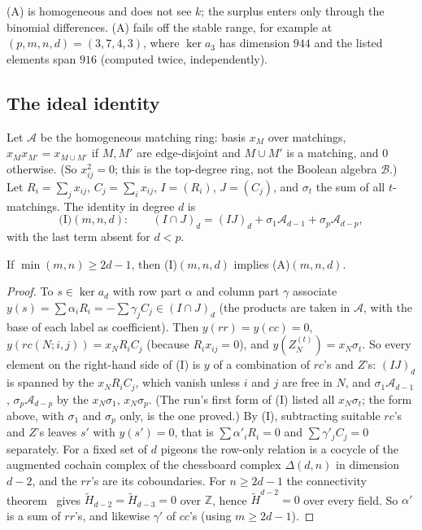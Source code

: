 (A) is homogeneous and does not see $k$; the surplus enters only through the binomial
differences.  (A) fails off the stable range, for example at $(p,m,n,d)=(3,7,4,3)$, where
$\ker a_3$ has dimension $944$ and the listed elements span $916$ (computed twice,
independently).

\subsection{The ideal identity}\label{sec:bands-identity}

Let $\mathcal A$ be the homogeneous matching ring: basis $x_M$ over matchings,
$x_Mx_{M'}=x_{M\cup M'}$ if $M,M'$ are edge-disjoint and $M\cup M'$ is a matching, and $0$
otherwise.  (So $x_{ij}^2=0$; this is the top-degree ring, not the Boolean algebra
$\mathcal B$.)  Let $R_i=\sum_jx_{ij}$, $C_j=\sum_ix_{ij}$, $I=(R_i)$, $J=(C_j)$, and
$\sigma_t$ the sum of all $t$-matchings.  The identity in degree $d$ is
\[
  \text{(I)}(m,n,d):\qquad (I\cap J)_d=(IJ)_d+\sigma_1\mathcal A_{d-1}+\sigma_p\mathcal A_{d-p},
\]
with the last term absent for $d<p$.

\begin{lemma}\label{lem:I-to-A}
If $\min(m,n)\ge2d-1$, then (I)$(m,n,d)$ implies (A)$(m,n,d)$.
\end{lemma}

\begin{proof}
To $s\in\ker a_d$ with row part $\alpha$ and column part $\gamma$ associate
$y(s)=\sum\alpha_iR_i=-\sum\gamma_jC_j\in(I\cap J)_d$ (the products are taken in
$\mathcal A$, with the base of each label as coefficient).  Then $y(rr)=y(cc)=0$,
$y(rc(N;i,j))=x_NR_iC_j$ (because $R_ix_{ij}=0$), and $y(Z^{(t)}_N)=x_N\sigma_t$.  So every
element on the right-hand side of (I) is $y$ of a combination of $rc$'s and $Z$'s: $(IJ)_d$ is
spanned by the $x_NR_iC_j$, which vanish unless $i$ and $j$ are free in $N$, and
$\sigma_1\mathcal A_{d-1}$, $\sigma_p\mathcal A_{d-p}$ by the $x_N\sigma_1$, $x_N\sigma_p$.
(The run's first form of (I) listed all $x_N\sigma_t$; the form above, with $\sigma_1$ and
$\sigma_p$ only, is the one proved.)  By (I), subtracting suitable $rc$'s and $Z$'s leaves $s'$ with $y(s')=0$, that is
$\sum\alpha'_iR_i=0$ and $\sum\gamma'_jC_j=0$ separately.  For a fixed set of $d$ pigeons
the row-only relation is a cocycle of the augmented cochain complex of the chessboard
complex $\Delta(d,n)$ in dimension $d-2$, and the $rr$'s are its coboundaries.  For
$n\ge2d-1$ the connectivity theorem~\cite[Thm.~1.1]{shareshianwachs} gives
$\tilde H_{d-2}=\tilde H_{d-3}=0$ over $\mathbb Z$, hence $\tilde H^{d-2}=0$ over every field.
So $\alpha'$ is a sum of $rr$'s, and likewise $\gamma'$ of $cc$'s (using $m\ge2d-1$).
\end{proof}

